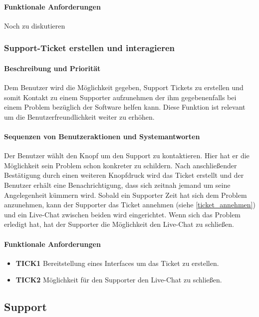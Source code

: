 \paragraph{Funktionale Anforderungen}
Noch zu diskutieren

\subsubsection{Support-Ticket erstellen und interagieren}
\paragraph{Beschreibung und Priorität}
Dem Benutzer wird die Möglichkeit gegeben, Support Tickets zu erstellen und somit Kontakt zu einem Supporter aufzunehmen der ihm gegebenenfalls bei einem Problem bezüglich der Software helfen kann. Diese Funktion ist relevant um die Benutzerfreundlichkeit weiter zu erhöhen.
\paragraph{Sequenzen von Benutzeraktionen und Systemantworten}
Der Benutzer wählt den Knopf um den Support zu kontaktieren. Hier hat er die Möglichkeit sein Problem schon konkreter zu schildern. Nach anschließender Bestätigung durch einen weiteren Knopfdruck wird das Ticket erstellt und der Benutzer erhält eine Benachrichtigung, dass sich zeitnah jemand um seine Angelegenheit kümmern wird. Sobald ein Supporter Zeit hat sich dem Problem anzunehmen, kann der Supporter das Ticket annehmen (siehe \ref{ticket_annehmen}) und ein Live-Chat zwischen beiden wird eingerichtet. Wenn sich das Problem erledigt hat, hat der Supporter die Möglichkeit den Live-Chat zu schließen.
\paragraph{Funktionale Anforderungen}
\begin{itemize}
\item \textbf{TICK1} Bereitstellung eines Interfaces um das Ticket zu erstellen.
\item \textbf{TICK2} Möglichkeit für den Supporter den Live-Chat zu schließen.
\end{itemize}


\subsection{Support}
